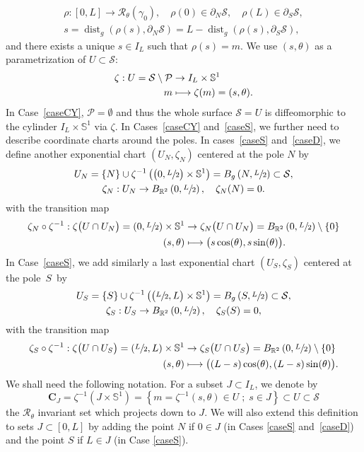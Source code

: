 \documentclass[JEP,XML,SOM,Unicode]{cedram}
\newcommand\mto{\mathchoice{\longmapsto}{\mapsto}{\mapsto}{\mapsto}}
\newcommand{\sep}{\;;\;}
\theoremstyle{definition}
\newcommand{\calR}{\ensuremath{\mathcal R}}
\renewcommand{\P}{\ensuremath{\mathcal P}}
\newcommand{\calS}{\ensuremath{\mathcal S}}
\newcommand{\mb}[1]{\ensuremath{\mathbb{#1}}}
\newcommand{\R}{{\mb{R}}}
\newcommand{\bS}{\ensuremath{\mathbb S}}
\DeclareMathOperator{\dist}{dist}
\let\d\partial
\newcommand\CO[1]{\boldsymbol{C}_{\!#1}}
\begin{document}
\begin{gather*}
\rho : [0,L]\to \calR_\theta (\gamma_0), \quad \rho (0) \in \d_N \calS, \quad \rho (L) \in \d_S \calS, \\
s = \dist_g( \rho(s), \d_N \calS) = L- \dist_g( \rho(s), \d_S \calS),
\end{gather*}
and there exists a unique $s \in I_L$ such that $\rho(s) = m$. We use $(s,\theta)$ as a parametrization of $U \subset \calS$:
\begin{align*}
\zeta : U = \mathcal{S} \setminus \P& \to I_L \times \bS^1\\
m& \mto \zeta(m) = (s, \theta).
\end{align*}
In Case~\ref{caseCY}, $\P=\emptyset$ and thus the whole surface $\calS = U$ is diffeomorphic to the cylinder $I_L \times \bS^1$ via $\zeta$.
In Cases~\ref{caseCY} and~\ref{caseS}, we further need to describe coordinate charts around the poles.
In cases~\ref{caseS} and~\ref{caseD}, we define another exponential chart $(U_N, \zeta_N)$ centered at the pole $N$ by
\begin{gather*}
U_N = \{N\} \cup \zeta^{-1} \left( \big( 0, \sfrac{L}{2} \big) \times \bS^1 \right) = B_g\left(N, \sfrac{L}{2}\right) \subset \calS,
\\ \zeta_N : U_N \to B_{\R^2}\left(0, \sfrac{L}{2}\right), \quad \zeta_N (N) = 0.
\end{gather*}
with the transition map
\begin{align*}
\zeta_N \circ \zeta^{-1} : \zeta \big(U\cap U_N \big) = \left( 0,\sfrac{L}{2} \right) \times \bS^1 & \to \zeta_N \big(U\cap U_N \big) = B_{\R^2}\left(0, \sfrac{L}{2}\right) \setminus \{ 0 \}\\
(s,\theta)& \mto \big(s \cos(\theta), s \sin (\theta) \big).
\end{align*}
In Case~\ref{caseS}, we add similarly a last exponential chart $(U_S, \zeta_S)$ centered at the pole~$S$~by
\begin{gather*}
U_S = \{S\} \cup \zeta^{-1} \left( \big( \sfrac{L}{2}, L \big) \times \bS^1 \right) = B_g\left(S, \sfrac{L}{2}\right) \subset \calS,
\\ \zeta_S : U_S \to B_{\R^2}\left(0, \sfrac{L}{2}\right), \quad \zeta_S (S) = 0,
\end{gather*}
with the transition map
\begin{align*}
\zeta_S \circ \zeta^{-1} : \zeta \big(U\cap U_S \big) = \left(\sfrac{L}{2}, L \right) \times \bS^1 & \to \zeta_S \big(U\cap U_S \big) = B_{\R^2}\left(0, \sfrac{L}{2}\right) \setminus \{ 0 \}\\
(s,\theta)& \mto \big((L-s) \cos(\theta), (L-s) \sin (\theta) \big).
\end{align*}
We shall need the following notation. For a subset $J\subset I_L$, we denote by
\[
\CO{J}=\zeta^{-1}(J\times\bS^1) = \left\{m=\zeta^{-1}(s,\theta)\in U\sep s\in J\right\} \subset U\subset \calS
\]
the $\calR_\theta$ invariant set which projects down to $J$.
We will also extend this definition to sets $J\subset [0,L]$ by adding the point $N$ if $0\in J$ (in Cases \ref{caseS} and~\ref{caseD}) and the point $S$ if $L\in J$ (in Case \ref{caseS}).
\end{document}

